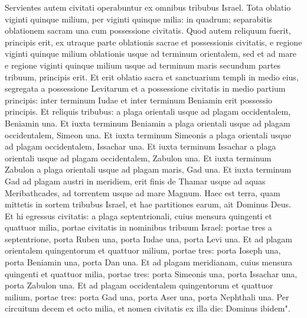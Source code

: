 \begin{biblechapter}
\verse Servientes autem civitati operabuntur ex omnibus tribubus Israel. 
\verse Tota oblatio viginti quinque milium, per viginti quinque milia: in quadrum; separabitis oblationem sacram una cum possessione civitatis. 
\verse Quod autem reliquum fuerit, principis erit, ex utraque parte oblationis sacrae et possessionis civitatis, e regione viginti quinque milium oblationis usque ad terminum orientalem, sed et ad mare e regione viginti quinque milium usque ad terminum maris secundum partes tribuum, principis erit. Et erit oblatio sacra et sanctuarium templi in medio eius, 
\verse segregata a possessione Levitarum et a possessione civitatis in medio partium principis: inter terminum Iudae et inter terminum Beniamin erit possessio principis. 
\verse Et reliquis tribubus: a plaga orientali usque ad plagam occidentalem, Beniamin una. 
\verse Et iuxta terminum Beniamin a plaga orientali usque ad plagam occidentalem, Simeon una. 
\verse Et iuxta terminum Simeonis a plaga orientali usque ad plagam occidentalem, Issachar una. 
\verse Et iuxta terminum Issachar a plaga orientali usque ad plagam occidentalem, Zabulon una. 
\verse Et iuxta terminum Zabulon a plaga orientali usque ad plagam maris, Gad una. 
\verse Et iuxta terminum Gad ad plagam austri in meridiem, erit finis de Thamar usque ad aquas Meribathcades, ad torrentem usque ad mare Magnum. 
\verse Haec est terra, quam mittetis in sortem tribubus Israel, et hae partitiones earum, ait Dominus Deus. 
\verse Et hi egressus civitatis: a plaga septentrionali, cuius mensura quingenti et quattuor milia, 
\verse portae civitatis in nominibus tribuum Israel: portae tres a septentrione, porta Ruben una, porta Iudae una, porta Levi una. 
\verse Et ad plagam orientalem quingentorum et quattuor milium, portae tres: porta Ioseph una, porta Beniamin una, porta Dan una. 
\verse Et ad plagam meridianam, cuius mensura quingenti et quattuor milia, portae tres: porta Simeonis una, porta Issachar una, porta Zabulon una. 
\verse Et ad plagam occidentalem quingentorum et quattuor milium, portae tres: porta Gad una, porta Aser una, porta Nephthali una. 
\verse Per circuitum decem et octo milia, et nomen civitatis ex illa die: Dominus ibidem".
\end{biblechapter}
